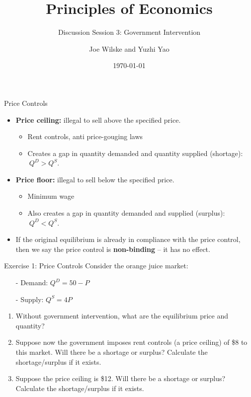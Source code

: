 \documentclass[9pt, handout]{beamer}
\title{Principles of Economics}
\subtitle{Discussion Session 3: Government Intervention}
\author{Joe Wilske and Yuzhi Yao}
\institute{Boston College}
\date{\today}
\begin{document}
\frame{\titlepage}

\begin{frame}{Price Controls}
    \begin{itemize}
        \item \textbf{Price ceiling:} illegal to sell above the specified price.
        \begin{itemize}
            \item Rent controls, anti price-gouging laws
            \item Creates a gap in quantity demanded and quantity supplied (shortage): $\: Q^D > Q^S$.
            \vspace{5pt}
        \end{itemize}
        \item \textbf{Price floor:} illegal to sell below the specified price.
        \begin{itemize}
            \item Minimum wage
            \item Also creates a gap in quantity demanded and supplied (surplus): $\: Q^D < Q^S$.
        \end{itemize}
        \vspace{5pt}
        \item If the original equilibrium is already in compliance with the price control, then we say the price control is \textbf{non-binding} -- it has no effect.
    \end{itemize}
\end{frame}

\begin{frame}{Exercise 1: Price Controls}
    Consider the orange juice market: 
    \begin{itemize}
        \item[-] Demand: $Q^D = 50 - P$
        \item[-] Supply: $Q^S = 4P$
    \end{itemize}
    \begin{enumerate}
        \item Without government intervention, what are the equilibrium price and quantity? 
        \item Suppose now the government imposes rent controls (a price ceiling) of \$8 to this market. Will there be a shortage or surplus? Calculate the shortage/surplus if it exists. 
        \item Suppose the price ceiling is \$12. Will there be a shortage or surplus? Calculate the shortage/surplus if it exists. 
    \end{enumerate}
    \vspace{1in}
\end{frame}
\end{document}
